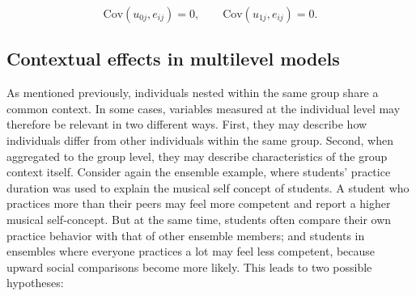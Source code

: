 \documentclass[
  letterpaper,
  11pt,
  english,
  singlespacing,
  headsepline,
  openany]{MastersDoctoralThesis}
\begin{document}
\[
\text{Cov}(u_{0j}, e_{ij}) = 0, \qquad
\text{Cov}(u_{1j}, e_{ij}) = 0.
\]

\subsection{Contextual effects in multilevel
models}\label{contextual-effects-in-multilevel-models}

As mentioned previously, individuals nested within the same group share
a common context. In some cases, variables measured at the individual
level may therefore be relevant in two different ways. First, they may
describe how individuals differ from other individuals within the same
group. Second, when aggregated to the group level, they may describe
characteristics of the group context itself. Consider again the ensemble
example, where students' practice duration was used to explain the
musical self concept of students. A student who practices more than
their peers may feel more competent and report a higher musical
self-concept. But at the same time, students often compare their own
practice behavior with that of other ensemble members; and students in
ensembles where everyone practices a lot may feel less competent,
because upward social comparisons become more likely. This leads to two
possible hypotheses:
\end{document}
